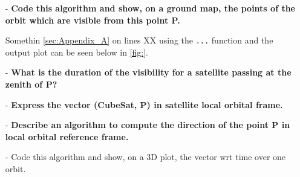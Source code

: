 \begin{itemize}
    \item[-] \textbf{Code this algorithm and show, on a ground map, the points of the orbit which are visible from this point P.}

    Somethin \autoref{sec:Appendix_A} on lines XX using the \verb|...| function and the output plot can be seen below in \autoref{fig:}.
    

    
    \item[-] \textbf{What is the duration of the visibility for a satellite passing at the zenith of P?}
\end{itemize}

 
\vspace{0.5cm}
\begin{itemize}
    \item[-] \textbf{Express the vector (CubeSat, P) in satellite local orbital frame.}
    \item[-] \textbf{Describe an algorithm to compute the direction of the point P in local orbital reference frame.}
    \item[-] Code this algorithm and show, on a 3D plot, the vector wrt time over one orbit.
\end{itemize}